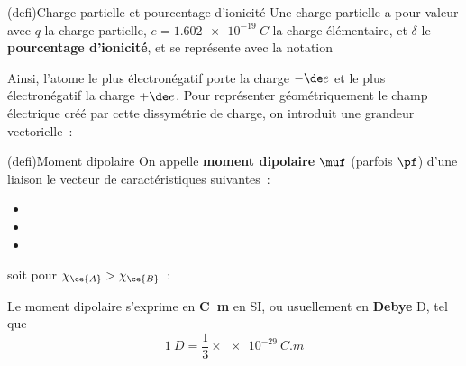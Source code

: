 \documentclass[../../main/main.tex]{subfiles}
\begin{document}
\begin{tcb*}[sidebyside](defi){Charge partielle et pourcentage d'ionicité}
	\tcblower
	Une charge partielle a pour valeur
	\psw{
		\[
			\boxed{q = \pm \delta e}
			\Lra
			\boxed{\de = \frac{\abs{q}}{e}}
		\]
	}
	avec $q$ la charge partielle, $e = \SI{1.602e-19}{C}$ la charge
	élémentaire, et $\delta$ le \textbf{pourcentage d'ionicité}, et se représente
	avec la notation
	\psw{
		\[
			\cfig{
				\charge{90=\|,180=\|,-90=\|,120:4pt=$\de-$}{A}-
				\charge{60:4pt=$\de+$}{B}
			}
		\]
	}
	\vspace{-15pt}
\end{tcb*}

Ainsi, l'atome le plus électronégatif porte la charge $-\de e$ et le plus
électronégatif la charge $+\de e$. Pour représenter géométriquement le champ
électrique créé par cette dissymétrie de charge, on introduit une grandeur
vectorielle~:

\begin{tcb*}[sidebyside, righthand ratio=.35](defi){Moment dipolaire}
	On appelle \textbf{moment dipolaire} $\muf$ (parfois $\pf$) d'une liaison le
	vecteur de caractéristiques suivantes~:
	\begin{itemize}
		\item {}
		\item
		\item
	\end{itemize}
	soit pour $\chi_{\ce{A}} > \chi_{\ce{B}}$~:
	\psw{
		\[
			\boxed{\muf_{\ce{A-B}} = q\ABf}
			\qquad \qquad
			\cfig{
				@{a}\charge{90=\|,180=\|,-90=\|,120:4pt=$\de-$}{A}-
				@{b}\charge{60:4pt=$\de+$}{B}
			}
			\chemmove[transform canvas={yshift=-10pt}]{
				\draw[-to]
				(a)--
				node[midway, below] {$\muf$}
				(b);
			}
		\]
	}
	\vspace{5pt}
	\tcblower
	\begin{center}
	\end{center}
	Le moment dipolaire s'exprime en \textbf{\si{C.m}} en SI, ou usuellement en
	\textbf{Debye} D, tel que
	\[\SI{1}{D} = \frac{1}{3}\times\SI{e-29}{C.m}\]
\end{tcb*}
\end{document}
